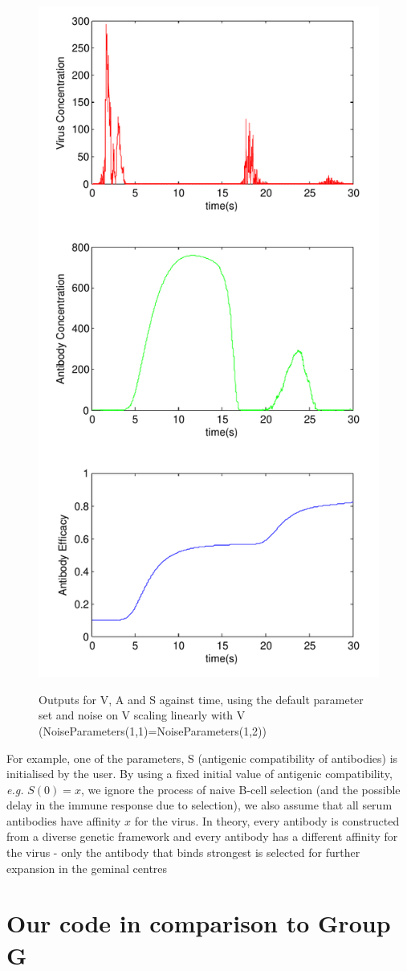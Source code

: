 \documentclass[a4paper, 12pt]{report}
\begin{document}
\begin{figure}
\begin{center}
\includegraphics[width=120mm]{Resurgance_scissored.pdf}
\label{resurgance}
\caption{Outputs for V, A and S against time, using the default parameter set and noise on V scaling linearly with V (NoiseParameters(1,1)=NoiseParameters(1,2))}
\end{center}
\end{figure}
For example, one of the parameters, S (antigenic compatibility of antibodies) is initialised by the user. By using a fixed initial value of antigenic compatibility, \emph{e.g.} $S(0) = x$, we ignore the process of naive B-cell selection (and the possible delay in the immune response due to selection), we also assume that all serum antibodies have affinity $x$ for the virus. In theory, every antibody is constructed from a diverse genetic framework and every antibody has a different affinity for the virus - only the antibody that binds strongest is selected for further expansion in the geminal centres %


\chapter{Our code in comparison to Group G}



\end{document}
